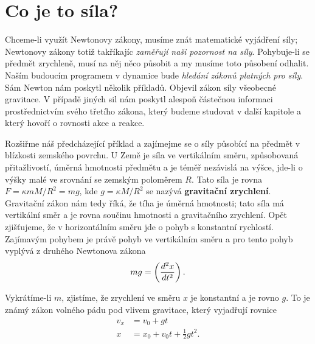 {  \section{Co je to síla?}\label{fyz:IchapIXsecIV}
    Chceme-li využít Newtonovy zákony, musíme znát matematické vyjádření síly; Newtonovy zákony 
    totiž takříkajíc \emph{zaměřují naši pozornost na síly}. Pohybuje-li se předmět zrychleně, musí 
    na něj něco působit a my musíme toto působení odhalit. Naším budoucím programem v dynamice bude 
    \emph{hledání zákonů platných pro síly}. Sám Newton nám poskytl několik příkladů. Objevil zákon 
    síly všeobecné gravitace. V případě jiných sil nám poskytl alespoň částečnou informaci 
    prostřednictvím svého třetího zákona, který budeme studovat v další kapitole a který hovoří o 
    rovnosti akce a reakce.
    
    Rozšiřme náš předcházející příklad a zajímejme se o síly působící na předmět v blízkosti 
    zemského povrchu. U Země je síla ve vertikálním směru, způsobovaná přitažlivostí, úměrná 
    hmotnosti předmětu a je téměř nezávislá na výšce, jde-li o výšky malé ve srovnání se zemským 
    poloměrem \(R\). Tato síla je rovna \(F= \kappa mM/R^2 = mg\), kde \(g = \kappa M/R^2\) se 
    nazývá \textbf{gravitační zrychlení}. Gravitační zákon nám tedy říká, že tíha je úměrná 
    hmotnosti; tato síla má vertikální směr a je rovna součinu hmotnosti a gravitačního zrychlení. 
    Opět zjišťujeme, že v horizontálním směru jde o pohyb s konstantní rychlostí. Zajímavým pohybem 
    je právě pohyb ve vertikálním směru a pro tento pohyb vyplývá z druhého Newtonova zákona
    \begin{equation}\label{FYZ:eq126}
      mg=\left(\frac{d^2 x}{d t^2}\right).
    \end{equation}
    
    Vykrátíme-li \(m\), zjistíme, že zrychlení ve směru \(x\) je konstantní a je rovno \(g\). To je 
    známý zákon volného pádu pod vlivem gravitace, který vyjadřují rovnice
    \begin{align}
      v_x &= v_0 + gt                       \nonumber \\
        x &= x_0 + v_0t + \frac{1}{2}gt^2.  \label{FYZ:eq127}
    \end{align}
    
}
